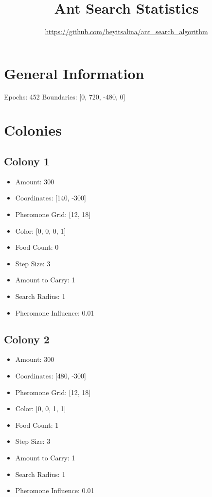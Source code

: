 \documentclass{article}
\begin{document}
    \title{Ant Search Statistics}
    \author{\url{https://github.com/heyitsalina/ant_search_algorithm}}
    \maketitle

    \section{General Information}

    Epochs: 452\newline
Boundaries: [0, 720, -480, 0]


    \section{Colonies}

    \subsection*{Colony 1}
\begin{itemize}
\item Amount: 300
\item Coordinates: [140, -300]
\item Pheromone Grid: [12, 18]
\item Color: [0, 0, 0, 1]
\item Food Count: 0
\item Step Size: 3
\item Amount to Carry: 1
\item Search Radius: 1
\item Pheromone Influence: 0.01
\end{itemize}
\subsection*{Colony 2}
\begin{itemize}
\item Amount: 300
\item Coordinates: [480, -300]
\item Pheromone Grid: [12, 18]
\item Color: [0, 0, 1, 1]
\item Food Count: 1
\item Step Size: 3
\item Amount to Carry: 1
\item Search Radius: 1
\item Pheromone Influence: 0.01
\end{itemize}
\end{document}
